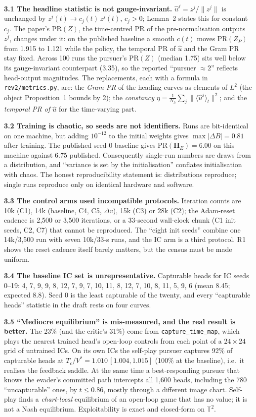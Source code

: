 \documentclass[10pt,a4paper]{article}
\newcommand{\PR}{\mathrm{PR}}
\newcommand{\T}{\mathbb{T}^2}
\begin{document}
\textbf{3.1 The headline statistic is not gauge-invariant.} $\hat u^j=z^j/\|z^j\|$ is unchanged by $z^j(t)\to c_j(t)\,z^j(t)$, $c_j>0$; Lemma~2 states this for constant $c_j$. The paper's $\PR(Z)$, the time-centred PR of the pre-normalisation outputs $z^j$, changes under it: on the published baseline a smooth $c(t)$ moves $\PR(Z_P)$ from 1.915 to 1.121 while the policy, the temporal PR of $\hat u$ and the Gram PR stay fixed. Across 100 runs the pursuer's $\PR(Z)$ (median 1.75) sits well below its gauge-invariant counterpart (3.35), so the reported ``pursuer $\approx2$'' reflects head-output magnitudes. The replacements, each with a formula in \texttt{rev2/metrics.py}, are: the \emph{Gram PR} of the heading curves as elements of $L^2$ (the object Proposition~1 bounds by 2); the \emph{constancy} $\eta=\frac1{N_h}\sum_j\|\langle\hat u^j\rangle_t\|^2$; and the \emph{temporal PR of $\hat u$} for the time-varying part.

\textbf{3.2 Training is chaotic, so seeds are not identifiers.} Runs are bit-identical on one machine, but adding $10^{-12}$ to the initial weights gives $\max|\Delta B|=0.81$ after training. The published seed-0 baseline gives $\PR(\boldsymbol H_E)=6.00$ on this machine against 6.75 published. Consequently single-run numbers are draws from a distribution, and ``variance is set by the initialisation'' conflates initialisation with chaos. The honest reproducibility statement is: distributions reproduce; single runs reproduce only on identical hardware and software.

\textbf{3.3 The control arms used incompatible protocols.} Iteration counts are 10k (C1), 14k (baseline, C4, C5, $\Delta v$), 15k (C3) or 28k (C2); the Adam-reset cadence is 2{,}500 or 3{,}500 iterations, or a 33-second wall-clock chunk (C1 init seeds, C2, C7) that cannot be reproduced. The ``eight init seeds'' combine one 14k/3{,}500 run with seven 10k/33-s runs, and the IC arm is a third protocol. R1 shows the reset cadence itself barely matters, but the census must be made uniform.

\textbf{3.4 The baseline IC set is unrepresentative.} Capturable heads for IC seeds 0--19: 4, 7, 9, 9, 8, 12, 7, 9, 7, 10, 11, 8, 12, 7, 10, 8, 11, 5, 9, 6 (mean 8.45; expected 8.8). Seed 0 is the least capturable of the twenty, and every ``capturable heads'' statistic in the draft rests on four curves.

\textbf{3.5 ``Mediocre equilibrium'' is mis-measured, and the real result is better.} The 23\% (and the critic's 31\%) come from \texttt{capture\_time\_map}, which plays the nearest trained head's open-loop controls from each point of a $24\times24$ grid of untrained ICs. On its own ICs the self-play pursuer captures 92\% of capturable heads at $T_c/V^*=1.010\,[1.004,1.015]$ (100\% at the baseline), i.e.\ it realises the feedback saddle. At the same time a best-responding pursuer that knows the evader's committed path intercepts all 1{,}600 heads, including the 780 ``uncapturable'' ones, by $t\le0.86$, mostly through a different image chart. Self-play finds a \emph{chart-local} equilibrium of an open-loop game that has no value; it is not a Nash equilibrium. Exploitability is exact and closed-form on $\T$.
\end{document}
